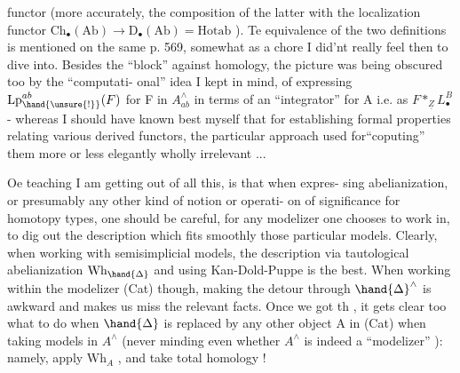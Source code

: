 functor (more accurately, the composition of the latter with the
localization functor $\mathrm{Ch}_{\bullet}(\mathrm{Ab})\longrightarrow \mathrm{D}_{\bullet}(\mathrm{Ab}) = \mathrm{Hotab}$ ). Te equivalence of
the two definitions is mentioned on the same p. 569, somewhat as a
chore I did'nt really feel then to dive into.  Besides the ``block''
against homology, the picture was being obscured too by the ``computati-%
onal'' idea I kept in mind, of expressing $\mathrm{Lp}_{\hand{\unsure{!}}}^{ab}(F)$ for F in $A^{\wedge}_{ab}$ in
terms of an ``integrator'' for A i.e. as $F *_{\underline{Z}} L^{B}_{\bullet}$ - whereas I should
have known best myself that for establishing formal properties relating
various derived functors, the particular  approach used
for``coputing'' them more or less elegantly  wholly irrelevant ...

Oe teaching I am getting out of all this, is that when expres-%
sing abelianization, or presumably any other kind of notion or operati-%
on of significance for homotopy types, one should be careful, for
any modelizer one chooses to work in, to dig out the description which
fits smoothly those particular models. Clearly, when working with
semisimplicial models, the description via tautological abelianization
$\mathrm{Wh}_{\hand{\Delta}}$ and using Kan-Dold-Puppe is the best. When working within the
modelizer (Cat) though, making the detour through $\hand{\Delta}^{\wedge}$ is awkward and
makes us  miss  the relevant facts. Once we got th
, it gets clear too what to do when $\hand{\Delta}$ is replaced by any
other object A in (Cat) 
when taking models in $A^{\wedge}$ (never minding even whether $A^{\wedge}$ is indeed a
``modelizer'' ): namely, apply $\mathrm{Wh}_{A}$ , and take total homology !

